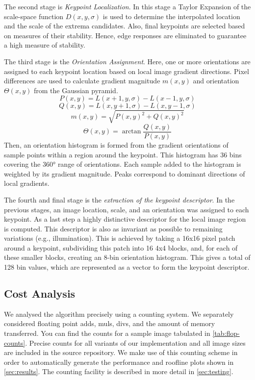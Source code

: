 \documentclass[letterpaper]{article}
\begin{document}
The second stage is \emph{Keypoint Localization}. In this stage a Taylor Expansion of the scale-space function $D(x,y,\sigma)$ is used to determine the interpolated location and the scale of the extrema candidates. Also, final keypoints are selected based on measures of their stability. Hence, edge responses are eliminated to guarantee a high measure of stability.

The third stage is the \emph{Orientation Assignment}. Here, one or more orientations are assigned to each keypoint location based on local image gradient directions. Pixel differences are used to calculate gradient magnitude $m(x,y)$ and orientation $\Theta(x,y)$ from the Gaussian pyramid.
\begin{equation}
    P(x,y)=L(x+1,y,\sigma) - L(x-1,y,\sigma)
\end{equation}
\begin{equation}
    Q(x,y)=L(x,y+1,\sigma)-L(x,y-1,\sigma)
\end{equation}
\begin{equation}
    m(x,y)=\sqrt{P(x,y)^2+Q(x,y)^2}
\end{equation}
\begin{equation}
    \Theta(x,y)=\arctan{\frac{Q(x,y)}{P(x,y)}}
\end{equation}
Then, an orientation histogram is formed from the gradient orientations of sample points within a region around the keypoint. This histogram has 36 bins covering the 360° range of orientations. Each sample added to the histogram is weighted by its gradient magnitude. Peaks correspond to dominant directions of local gradients.

The fourth and final stage is the \emph{extraction of the keypoint descriptor}. In the previous stages, an image location, scale, and an orientation was assigned to each keypoint. As a last step a highly distinctive descriptor for the local image region is computed. This descriptor is also as invariant as possible to remaining variations (e.g., illumination). This is achieved by taking a 16x16 pixel patch around a keypoint, subdividing this patch into 16 4x4 blocks, and, for each of these smaller blocks, creating an 8-bin orientation histogram. This gives a total of 128 bin values, which are represented as a vector to form the keypoint descriptor.


\subsection*{Cost Analysis}
We analysed the algorithm precisely using a counting system. We separately considered floating point adds, muls, divs, and the amount of memory transferred. You can find the counts for a sample image tabulated in \autoref{tab:flop-counts}. Precise counts for all variants of our implementation and all image sizes are included in the source repository\cite{ethsift}. We make use of this counting scheme in order to automatically generate the performance and roofline plots shown in \autoref{sec:results}. The counting facility is described in more detail in \autoref{sec:testing}.
\end{document}
